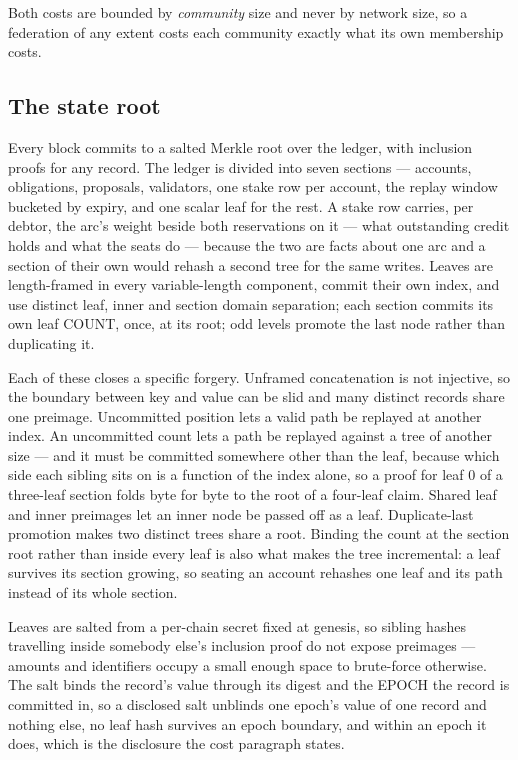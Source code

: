 Both costs are bounded by \emph{community} size and never by network size, so a federation
of any extent costs each community exactly what its own membership costs.

\subsection{The state root}

Every block commits to a salted Merkle root over the ledger, with inclusion proofs for
any record. The ledger is divided into seven sections --- accounts, obligations,
proposals, validators, one stake row per account, the replay window bucketed by expiry,
and one scalar leaf for the rest. A stake row carries, per debtor, the arc's weight beside
both reservations on it --- what outstanding credit holds and what the seats do --- because
the two are facts about one arc and a section of their own would rehash a second tree for
the same writes. Leaves are length-framed in every variable-length component, commit their
own index, and use distinct leaf, inner and section domain separation; each section
commits its own leaf COUNT, once, at its root; odd levels promote the last node rather
than duplicating it.

Each of these closes a specific forgery. Unframed concatenation is not injective, so the
boundary between key and value can be slid and many distinct records share one preimage.
Uncommitted position lets a valid path be replayed at another index. An uncommitted
count lets a path be replayed against a tree of another size --- and it must be committed
somewhere other than the leaf, because which side each sibling sits on is a function of
the index alone, so a proof for leaf $0$ of a three-leaf section folds byte for byte to
the root of a four-leaf claim. Shared leaf and inner preimages let an inner node be
passed off as a leaf. Duplicate-last promotion makes two distinct trees share a root.
Binding the count at the section root rather than inside every leaf is also what makes
the tree incremental: a leaf survives its section growing, so seating an account rehashes
one leaf and its path instead of its whole section.

Leaves are salted from a per-chain secret fixed at genesis, so sibling hashes travelling
inside somebody else's inclusion proof do not expose preimages --- amounts and identifiers
occupy a small enough space to brute-force otherwise. The salt binds the record's value
through its digest and the EPOCH the record is committed in, so a disclosed salt unblinds
one epoch's value of one record and nothing else, no leaf hash survives an epoch boundary,
and within an epoch it does, which is the disclosure the cost paragraph states.

